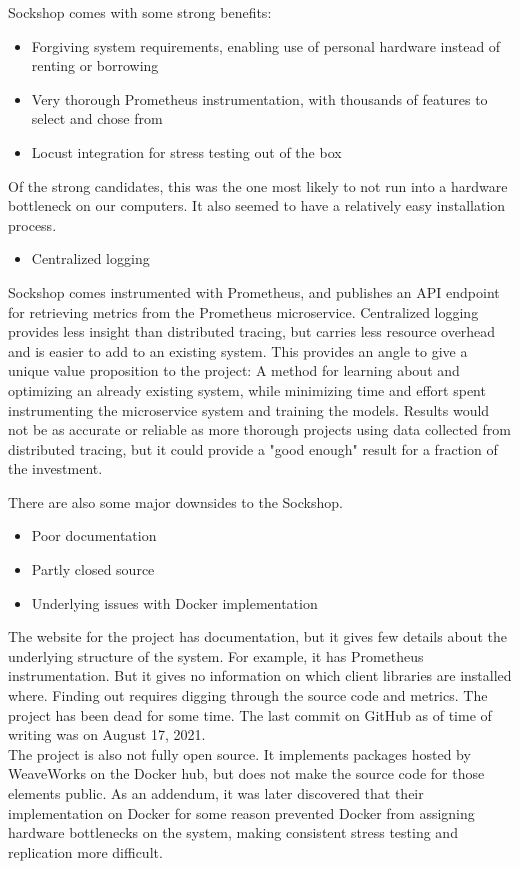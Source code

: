 Sockshop comes with some strong benefits:

\begin{itemize}
    \item Forgiving system requirements, enabling use of personal hardware instead of renting or borrowing
    \item Very thorough Prometheus instrumentation, with thousands of features to select and chose from
    \item Locust integration for stress testing out of the box
\end{itemize}

Of the strong candidates, this was the one most likely to not run into a hardware bottleneck on our computers.
It also seemed to have a relatively easy installation process.

\begin{itemize}
    \item Centralized logging
\end{itemize}
Sockshop comes instrumented with Prometheus, and publishes an API endpoint for retrieving metrics from the Prometheus microservice. Centralized logging provides less insight than distributed tracing, but carries less resource overhead and is easier to add to an existing system.
This provides an angle to give a unique value proposition to the project: A method for learning about and optimizing an already existing system, while minimizing time and effort spent instrumenting the microservice system and training the models. Results would not be as accurate or reliable as more thorough projects using data collected from distributed tracing, but it could provide a "good enough" result for a fraction of the investment.

There are also some major downsides to the Sockshop.

\begin{itemize}
    \item Poor documentation
    \item Partly closed source
    \item Underlying issues with Docker implementation
\end{itemize}
The website for the project \cite*{Weaveworks} has documentation, but it gives few details about the underlying structure of the system.
For example, it has Prometheus instrumentation. But it gives no information on which client libraries are installed where. Finding out requires digging through the source code and metrics.
The project has been dead for some time. The last commit on GitHub as of time of writing was on August 17, 2021.\\
The project is also not fully open source. It implements packages hosted by WeaveWorks on the Docker hub, but does not make the source code for those elements public. As an addendum, it was later discovered that their implementation on Docker for some reason prevented Docker from assigning hardware bottlenecks on the system, making consistent stress testing and replication more difficult.

